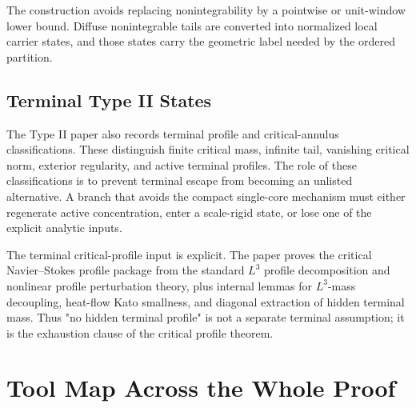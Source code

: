 \documentclass[11pt]{amsart}
\begin{document}
The construction avoids replacing nonintegrability by a pointwise or unit-window lower bound.  Diffuse nonintegrable tails are converted into normalized local carrier states, and those states carry the geometric label needed by the ordered partition.

\subsection{Terminal Type II States}

The Type II paper also records terminal profile and critical-annulus classifications.  These distinguish finite critical mass, infinite tail, vanishing critical norm, exterior regularity, and active terminal profiles.  The role of these classifications is to prevent terminal escape from becoming an unlisted alternative.  A branch that avoids the compact single-core mechanism must either regenerate active concentration, enter a scale-rigid state, or lose one of the explicit analytic inputs.

The terminal critical-profile input is explicit.  The paper proves the critical Navier--Stokes profile package from the standard \(L^3\) profile decomposition and nonlinear profile perturbation theory, plus internal lemmas for \(L^3\)-mass decoupling, heat-flow Kato smallness, and diagonal extraction of hidden terminal mass.  Thus "no hidden terminal profile" is not a separate terminal assumption; it is the exhaustion clause of the critical profile theorem.

\section{Tool Map Across the Whole Proof}
\end{document}
